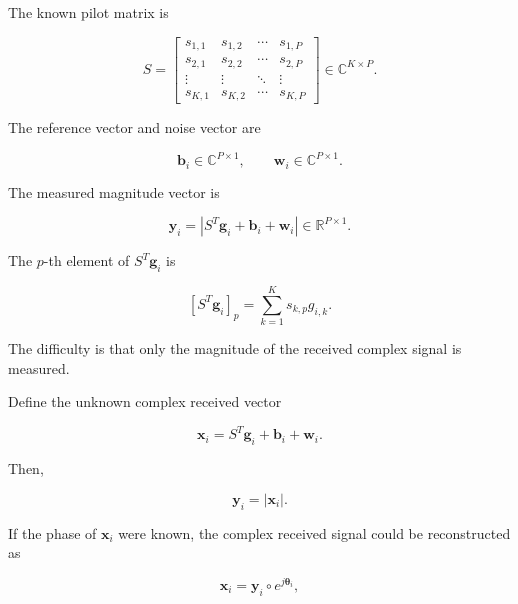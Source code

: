 \documentclass[12pt,a4paper]{article}
\begin{document}
The known pilot matrix is

\begin{equation}
\boxed{
S=
\begin{bmatrix}
s_{1,1} & s_{1,2} & \cdots & s_{1,P}\\
s_{2,1} & s_{2,2} & \cdots & s_{2,P}\\
\vdots & \vdots & \ddots & \vdots\\
s_{K,1} & s_{K,2} & \cdots & s_{K,P}
\end{bmatrix}
\in
\mathbb C^{K\times P}
}.
\tag{230}
\end{equation}

The reference vector and noise vector are

\begin{equation}
\mathbf b_i\in\mathbb C^{P\times1},
\qquad
\mathbf w_i\in\mathbb C^{P\times1}.
\tag{231}
\end{equation}

The measured magnitude vector is

\begin{equation}
\boxed{
\mathbf y_i
=
\left|
S^T\mathbf g_i+\mathbf b_i+\mathbf w_i
\right|
\in
\mathbb R^{P\times1}
}.
\tag{232}
\end{equation}

The $p$-th element of $S^T\mathbf g_i$ is

\begin{equation}
\left[S^T\mathbf g_i\right]_p
=
\sum_{k=1}^{K}
s_{k,p}g_{i,k}.
\tag{233}
\end{equation}

The difficulty is that only the magnitude of the received complex signal is measured.

Define the unknown complex received vector

\begin{equation}
\boxed{
\mathbf x_i
=
S^T\mathbf g_i+\mathbf b_i+\mathbf w_i
}.
\tag{234}
\end{equation}

Then,

\begin{equation}
\mathbf y_i=|\mathbf x_i|.
\tag{235}
\end{equation}

If the phase of $\mathbf x_i$ were known, the complex received signal could be reconstructed as

\begin{equation}
\mathbf x_i
=
\mathbf y_i\circ e^{j\boldsymbol{\theta}_i},
\tag{236}
\end{equation}
\end{document}

